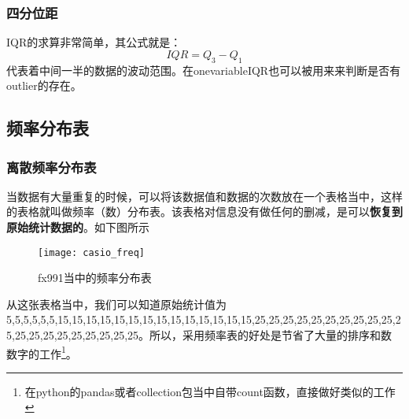 \subsubsection*{四分位距}
\gls{IQR}的求算非常简单，其公式就是：
\[
	IQR = Q_3-Q_1
\]
代表着中间一半的数据的波动范围。在\gls{onevariable}IQR也可以被用来来判断是否有\gls{outlier}的存在。
\clearpage


\subsection*{频率分布表}
\subsubsection*{离散频率分布表}
当数据有大量重复的时候，可以将该数据值和数据的次数放在一个表格当中，这样的表格就叫做频率（数）分布表。该表格对信息没有做任何的删减，是可以\textbf{恢复到原始统计数据的}。如下图所示
\begin{figure}[H]
\centering
\texttt{[image: casio\_freq]}
\label{fig:casiofreq}
\caption{fx991当中的频率分布表}
\end{figure}
从这张表格当中，我们可以知道原始统计值为5,5,5,5,5,5,15,15,15,15,15,15,15,15,15,15,15,15,15,15,25,25,25,25,25,25,25,25,25,25,25,25,25,25,25,25,25,25,25,25。所以，采用频率表的好处是节省了大量的排序和数数字的工作\footnote{在python的pandas或者collection包当中自带count函数，直接做好类似的工作}。

